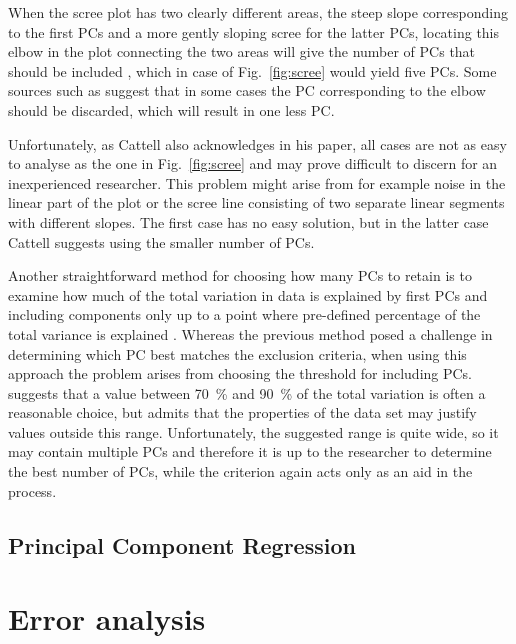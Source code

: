 \documentclass[english, oneside]{HYgradu}
\begin{document}
When the scree plot has two clearly different areas, the steep slope corresponding to the first PCs and a more gently sloping scree for the latter PCs, locating this elbow in the plot connecting the two areas will give the number of PCs that should be included \citep{jolliffe2002principal}, which in case of Fig.\ \ref{fig:scree} would yield five PCs. Some sources such as \citep{cattell1966scree} suggest that in some cases the PC corresponding to the elbow should be discarded, which will result in one less PC.

Unfortunately, as Cattell also acknowledges in his paper, all cases are not as easy to analyse as the one in Fig.\ \ref{fig:scree} and may prove difficult to discern for an inexperienced researcher. This problem might arise from for example noise in the linear part of the plot or the scree line consisting of two separate linear segments with different slopes. The first case has no easy solution, but in the latter case Cattell suggests using the smaller number of PCs.

Another straightforward method for choosing how many PCs to retain is to examine how much of the total variation in data is explained by first PCs and including components only up to a point where pre-defined percentage of the total variance is explained \citep{jolliffe2002principal}. Whereas the previous method posed a challenge in determining which PC best matches the exclusion criteria, when using this approach the problem arises from choosing the threshold for including PCs. \citet{jolliffe2002principal} suggests that a value between 70~\% and 90~\% of the total variation is often a reasonable choice, but admits that the properties of the data set may justify values outside this range. Unfortunately, the suggested range is quite wide, so it may contain multiple PCs and therefore it is up to the researcher to determine the best number of PCs, while the criterion again acts only as an aid in the process. 



\subsection{Principal Component Regression}

\section{Error analysis}
\end{document}

